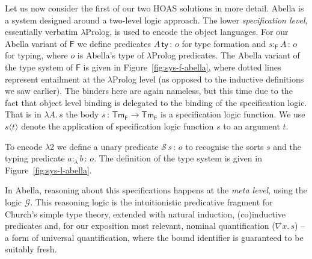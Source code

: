 \documentclass[a4paper,UKenglish]{lipics-v2016}
\newcommand{\ms}{\,}
\newcommand{\mrel}[1]{\mathrel{\ms #1 \ms}}
\newcommand{\OF}{\mrel{:}}
\newcommand{\SysF}{\ensuremath{\mathsf{F}}\xspace}
\newcommand{\SysL}{$\lambda$2\xspace}
\newcommand{\TmF}{\ensuremath{\mathsf{Tm_{F}}}}
\newcommand{\istyFh}[1]{\ensuremath{#1\ms\mathsf{ty}}}
\newcommand{\typingFh}[2]{\ensuremath{#1 \mathbin{:_{\SysF}} #2}}
\newcommand{\sortLh}[1]{\ensuremath{\mathcal{S}\ms#1}}
\newcommand{\typingLh}[2]{\ensuremath{#1 \mathbin{:_{\lambda}} #2}}
\newcommand{\lpApp}[2]{#1\langle#2\rangle}
\newcommand{\Lam}[1]{\ensuremath{\lambda #1.\,}}
\begin{document}
Let us now consider the first of our two HOAS solutions in more detail.
Abella is a system designed around a two-level logic approach.
The lower \emph{specification level}, essentially verbatim $\lambda$Prolog, is used to encode the object languages.
For our Abella variant of \SysF we define predicates $\istyFh{A} \OF o$ for type formation and $\typingFh{s}{A} \OF o$ for typing, where $o$ is Abella's type of $\lambda$Prolog predicates.
The Abella variant of the type system of \SysF is given in Figure~\ref{fig:sys-f-abella}, where dotted lines represent entailment at the $\lambda$Prolog level (as opposed to the inductive definitions we saw earlier).
The binders here are again nameless, but this time due to the fact that object level binding is delegated to the binding of the specification logic.
That is in $\Lam{A}{s}$ the body $s \OF \TmF \to \TmF$ is a specification logic function.
We use $\lpApp{s}{t}$ denote the application of specification logic function $s$ to an argument $t$.

To encode \SysL we define a unary predicate $\sortLh{s} \OF o$ to recognise the sorts $s$ and the typing predicate $\typingLh{a}{b} \OF o$.
The definition of the type system is given in Figure~\ref{fig:sys-l-abella}.

In Abella, reasoning about this specifications happens at the \emph{meta level}, using the logic $\mathcal{G}$.
This reasoning logic is the intuitionistic predicative fragment for Church's simple type theory, extended with natural induction, (co)inductive predicates and, for our exposition most relevant, nominal quantification ($\nabla x . \ms s$) -- a form of universal quantification, where the bound identifier is guaranteed to be suitably fresh.
\end{document}
